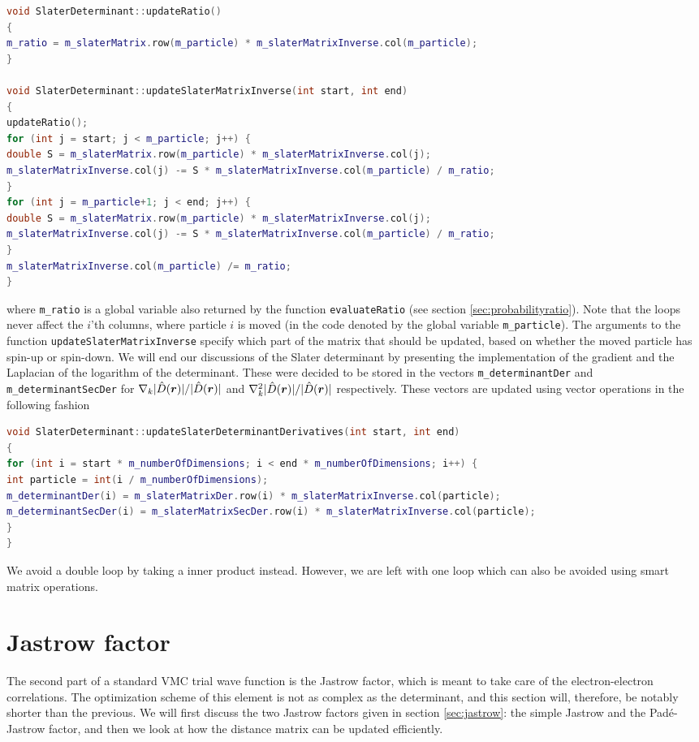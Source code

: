 \begin{lstlisting}[language={c++}]
void SlaterDeterminant::updateRatio()
{
m_ratio = m_slaterMatrix.row(m_particle) * m_slaterMatrixInverse.col(m_particle);
}

void SlaterDeterminant::updateSlaterMatrixInverse(int start, int end)
{
updateRatio();
for (int j = start; j < m_particle; j++) {
double S = m_slaterMatrix.row(m_particle) * m_slaterMatrixInverse.col(j);
m_slaterMatrixInverse.col(j) -= S * m_slaterMatrixInverse.col(m_particle) / m_ratio;
}
for (int j = m_particle+1; j < end; j++) {
double S = m_slaterMatrix.row(m_particle) * m_slaterMatrixInverse.col(j);
m_slaterMatrixInverse.col(j) -= S * m_slaterMatrixInverse.col(m_particle) / m_ratio;
}
m_slaterMatrixInverse.col(m_particle) /= m_ratio;
}
\end{lstlisting}
where \lstinline{m_ratio} is a global variable also returned by the function \lstinline{evaluateRatio} (see section \ref{sec:probabilityratio}). Note that the loops never affect the $i$'th columns, where particle $i$ is moved (in the code denoted by the global variable \lstinline{m_particle}). The arguments to the function \lstinline{updateSlaterMatrixInverse} specify which part of the matrix that should be updated, based on whether the moved particle has spin-up or spin-down. We will end our discussions of the Slater determinant by presenting the implementation of the gradient and the Laplacian of the logarithm of the determinant. These were decided to be stored in the vectors \lstinline{m_determinantDer} and \lstinline{m_determinantSecDer} for $\nabla_k|\hat{D}(\boldsymbol{{r}})|/|\hat{D}(\boldsymbol{{r}})|$ and $\nabla_k^2|\hat{D}(\boldsymbol{{r}})|/|\hat{D}(\boldsymbol{{r}})|$ respectively. These vectors are updated using vector operations in the following fashion
\begin{lstlisting}[language={c++}]
void SlaterDeterminant::updateSlaterDeterminantDerivatives(int start, int end)
{
for (int i = start * m_numberOfDimensions; i < end * m_numberOfDimensions; i++) {
int particle = int(i / m_numberOfDimensions);
m_determinantDer(i) = m_slaterMatrixDer.row(i) * m_slaterMatrixInverse.col(particle);
m_determinantSecDer(i) = m_slaterMatrixSecDer.row(i) * m_slaterMatrixInverse.col(particle);
}
}
\end{lstlisting}
We avoid a double loop by taking a inner product instead. However, we are left with one loop which can also be avoided using smart matrix operations.

\section{Jastrow factor}
The second part of a standard VMC trial wave function is the Jastrow factor, which is meant to take care of the electron-electron correlations. The optimization scheme of this element is not as complex as the determinant, and this section will, therefore, be notably shorter than the previous. We will first discuss the two Jastrow factors given in section \ref{sec:jastrow}: the simple Jastrow and the Padé-Jastrow factor, and then we look at how the distance matrix can be updated efficiently. 

